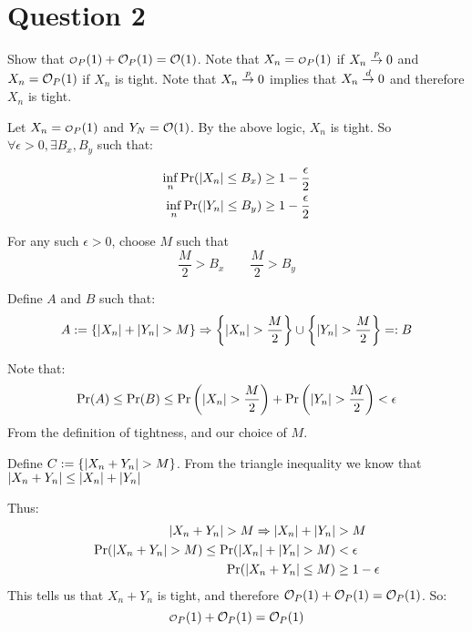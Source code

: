 \documentclass[12pt]{paper}
\begin{document}
\section{Question 2}


Show that $\smallO_P(1) + \bigO_P(1) = \bigO(1)$.
\newline\newline
Note that $X_n = \smallO_P(1)$ if $X_n \overset{p}{\to} 0$ and $X_n = \mathcal{O}_P(1)$
if $X_n$ is tight. Note that $X_n \overset{p}{\to} 0$ implies that $X_n \overset{d}{\to}
0$ and therefore $X_n$ is tight.

Let $X_n = \smallO_P(1)$ and $Y_N = \mathcal{O}(1)$. By the above logic,
$X_n$ is tight. So $\forall \epsilon > 0, \exists B_x, B_y$ such that:

\begin{align*}
  \inf_n \Pr( \left \lvert X_n \right \rvert \leq B_x) &\geq 1- \frac{\epsilon}{2}\\
  \inf_n \Pr( \left \lvert Y_n \right \rvert \leq B_y) &\geq 1 - \frac{\epsilon}{2}
\end{align*}

For any such $\epsilon > 0$, choose $M$ such that
\begin{equation*}
  \frac{M}{2} > B_x \quad \quad \frac{M}{2} > B_y
\end{equation*}

Define $A$ and $B$ such that:
\begin{equation*}
  A := \{ \left \lvert X_n \right \rvert + \left \lvert Y_n \right \rvert > M \} \Rightarrow \left \{\left \lvert X_n \right \rvert >
    \frac{M}{2} \right\} \cup
\left\{\left \lvert Y_n \right \rvert > \frac{M}{2} \right\} =: B
\end{equation*}

Note that:
\begin{equation*}
  \Pr( A) \leq \Pr(B) \leq \Pr\left( \left \lvert X_n \right \rvert > \frac{M}{2}\right) + \Pr\left( \left \lvert Y_n \right \rvert > \frac{M}{2}\right) < \epsilon
\end{equation*}
From the definition of tightness, and our choice of $M$. 

Define $C := \{ \left \lvert  X_n + Y_n \right \rvert > M \}$. From the triangle inequality
we know that $\left \lvert X_n + Y_n \right \rvert \leq \left \lvert X_n \right \rvert + \left \lvert Y_n \right \rvert$

Thus:
\begin{align*}
  \left \lvert X_n + Y_n \right \rvert > M \Rightarrow \left \lvert X_n \right \rvert + \left \lvert Y_n \right \rvert &> M \\
  \Pr( \left \lvert X_n + Y_n  \right \rvert > M) \leq \Pr( \left \lvert X_n \right \rvert + \left \lvert Y_n \right \rvert > M) &< \epsilon\\
  \Pr( \left \lvert X_n + Y_n \right \rvert \leq M ) &\geq 1 - \epsilon
\end{align*}
 This tells us that
$X_n + Y_n$ is tight, and therefore
$\mathcal{O}_P(1) + \mathcal{O}_P(1) = \mathcal{O}_P(1)$. So:
\begin{equation*}
  \smallO_P(1) + \bigO_P(1) = \bigO_P(1) 
\end{equation*}
\end{document}
